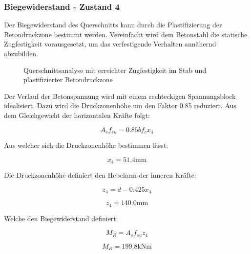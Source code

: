 \documentclass[
  12pt,
  letterpaper,
  egregdoesnotlikesansseriftitles]{scrreprt}
\begin{document}
\subsubsection{Biegewiderstand - Zustand
4}\label{biegewiderstand---zustand-4}

Der Biegewiderstand des Querschnitts kann durch die Plastifizierung der
Betondruckzone bestimmt werden. Vereinfacht wird dem Betonstahl die
statische Zugfestigkeit vorausgesetzt, um das verfestigende Verhalten
annähernd abzubilden.

\begin{figure}[H]


\caption{\label{fig-qs5}Querschnittsanalyse mit erreichter Zugfestigkeit
im Stab und plastifizierter Betondruckzone}

\end{figure}%

Der Verlauf der Betonspannung wird mit einem rechteckigen Spannungsblock
idealisiert. Dazu wird die Druckzonenhöhe um den Faktor 0.85 reduziert.
Aus dem Gleichgewicht der horizontalen Kräfte folgt:

\begin{equation}A_{s} f_{su} = 0.85 b f_{c} x_{4}\end{equation}

Aus welcher sich die Druckzonenhöhe bestimmen lässt:

\begin{equation}x_{4} = 51.4 \text{mm}\end{equation}

Die Druckzonenhöhe definiert den Hebelarm der inneren Kräfte:

\begin{equation}z_{4} = d - 0.425 x_{4}\end{equation}

\begin{equation}z_{4} = 140.0 \text{mm}\end{equation}

Welche den Biegewiderstand definiert:

\begin{equation}M_{R} = A_{s} f_{su} z_{4}\end{equation}

\begin{equation}M_{R} = 199.8 \text{kN} \text{m}\end{equation}
\end{document}
